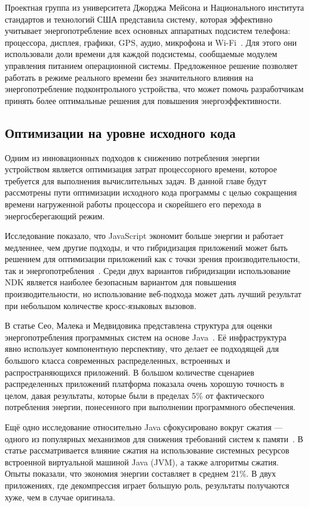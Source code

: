 \documentclass[a4paper,14pt]{extarticle} %
\begin{document}
	Проектная группа из университета Джорджа Мейсона и Национального института стандартов и технологий США представила систему, которая эффективно учитывает энергопотребление всех основных аппаратных подсистем телефона: процессора, дисплея, графики, GPS, аудио, микрофона и Wi-Fi~\parencite{murmuria2012mobile}. Для этого они использовали доли времени для каждой подсистемы, сообщаемые модулем управления питанием операционной системы. Предложенное решение позволяет работать в режиме реального времени без значительного влияния на энергопотребление подконтрольного устройства, что может помочь разработчикам принять более оптимальные решения для повышения энергоэффективности.

	\subsection{Оптимизации на уровне исходного кода}

	Одним из инновационных подходов к снижению потребления энергии устройством является оптимизация затрат процессорного времени, которое требуется для выполнения вычислительных задач. В данной главе будут рассмотрены пути оптимизации исходного кода программы с целью сокращения времени нагруженной работы процессора и скорейшего его перехода в энергосберегающий режим.
	
	Исследование показало, что JavaScript экономит больше энергии и работает медленнее, чем другие подходы, и что гибридизация приложений может быть решением для оптимизации приложений как с точки зрения производительности, так и энергопотребления~\parencite{oliveira2017study}. Среди двух вариантов гибридизации использование NDK является наиболее безопасным вариантом для повышения производительности, но использование веб-подхода может дать лучший результат при небольшом количестве кросс-языковых вызовов.
	
	В статье Сео, Малека и Медвидовика представлена структура для оценки энергопотребления программных систем на основе Java~\parencite{seo2007energy}. Её инфраструктура явно использует компонентную перспективу, что делает ее подходящей для большого класса современных распределенных, встроенных и распространяющихся приложений. В большом количестве сценариев распределенных приложений платформа показала очень хорошую точность в целом, давая результаты, которые были в пределах 5\% от фактического потребления энергии, понесенного при выполнении программного обеспечения. 
	
	Ещё одно исследование относительно Java сфокусировано вокруг сжатия --- одного из популярных механизмов для снижения требований систем к памяти~\parencite{гуанджиу2004экономия}. В статье рассматривается влияние сжатия на использование системных ресурсов встроенной виртуальной машиной Java (JVM), а также алгоритмы сжатия. Опыты показали, что экономия энергии составляет в среднем 21\%. В двух приложениях, где декомпрессия играет большую роль, результаты получаются хуже, чем в случае оригинала.
	
\end{document}

